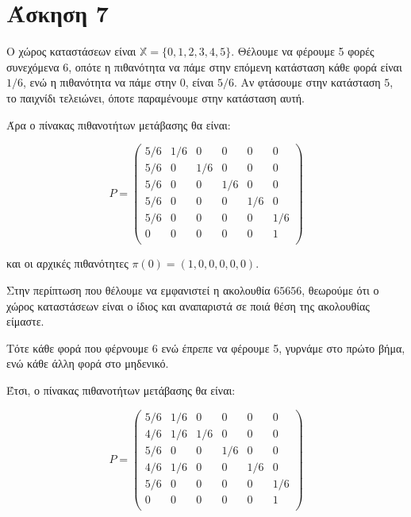 \documentclass[11pt,a4paper]{article}
\begin{document}
\section*{Άσκηση 7}

Ο χώρος καταστάσεων είναι $\mathbb{X} = \{0, 1, 2, 3, 4, 5\}$. Θέλουμε να φέρουμε 5 φορές συνεχόμενα 6, οπότε η πιθανότητα να πάμε στην επόμενη κατάσταση κάθε φορά είναι $1/6$, ενώ η πιθανότητα να πάμε στην $0$, είναι $5/6$. Αν φτάσουμε στην κατάσταση $5$, το παιχνίδι τελειώνει, όποτε παραμένουμε στην κατάσταση αυτή.

Άρα ο πίνακας πιθανοτήτων μετάβασης θα είναι:

\begin{equation*}
    P =
    \begin{pmatrix}
        5/6 & 1/6 & 0   & 0   & 0   & 0   \\
        5/6 & 0   & 1/6 & 0   & 0   & 0   \\
        5/6 & 0   & 0   & 1/6 & 0   & 0   \\
        5/6 & 0   & 0   & 0   & 1/6 & 0   \\
        5/6 & 0   & 0   & 0   & 0   & 1/6 \\
        0   & 0   & 0   & 0   & 0   & 1   \\
    \end{pmatrix}
\end{equation*}

και οι αρχικές πιθανότητες $π(0) = (1, 0, 0, 0, 0, 0)$.


Στην περίπτωση που θέλουμε να εμφανιστεί η ακολουθία $65656$, θεωρούμε ότι ο χώρος καταστάσεων είναι ο ίδιος και αναπαριστά σε ποιά θέση της ακολουθίας είμαστε.

Τότε κάθε φορά που φέρνουμε 6 ενώ έπρεπε να φέρουμε 5, γυρνάμε στο πρώτο βήμα, ενώ κάθε άλλη φορά στο μηδενικό.

Έτσι, ο πίνακας πιθανοτήτων μετάβασης θα είναι:

\begin{equation*}
    P =
    \begin{pmatrix}
        5/6 & 1/6 & 0   & 0   & 0   & 0   \\
        4/6 & 1/6 & 1/6 & 0   & 0   & 0   \\
        5/6 & 0   & 0   & 1/6 & 0   & 0   \\
        4/6 & 1/6 & 0   & 0   & 1/6 & 0   \\
        5/6 & 0   & 0   & 0   & 0   & 1/6 \\
        0   & 0   & 0   & 0   & 0   & 1   \\
    \end{pmatrix}
\end{equation*}
\end{document}
